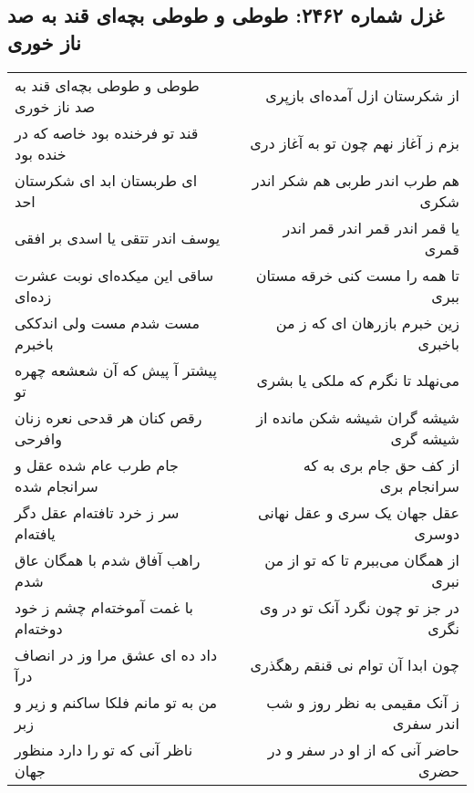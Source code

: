 \begin{center}
\section*{غزل شماره ۲۴۶۲: طوطی و طوطی بچه‌ای قند به صد ناز خوری}
\label{sec:2462}
\begin{longtable}{l p{0.5cm} r}
طوطی و طوطی بچه‌ای قند به صد ناز خوری
&&
از شکرستان ازل آمده‌ای بازپری
\\
قند تو فرخنده بود خاصه که در خنده بود
&&
بزم ز آغاز نهم چون تو به آغاز دری
\\
ای طربستان ابد ای شکرستان احد
&&
هم طرب اندر طربی هم شکر اندر شکری
\\
یوسف اندر تتقی یا اسدی بر افقی
&&
یا قمر اندر قمر اندر قمر اندر قمری
\\
ساقی این میکده‌ای نوبت عشرت زده‌ای
&&
تا همه را مست کنی خرقه مستان ببری
\\
مست شدم مست ولی اندککی باخبرم
&&
زین خبرم بازرهان ای که ز من باخبری
\\
پیشتر آ پیش که آن شعشعه چهره تو
&&
می‌نهلد تا نگرم که ملکی یا بشری
\\
رقص کنان هر قدحی نعره زنان وافرحی
&&
شیشه گران شیشه شکن مانده از شیشه گری
\\
جام طرب عام شده عقل و سرانجام شده
&&
از کف حق جام بری به که سرانجام بری
\\
سر ز خرد تافته‌ام عقل دگر یافته‌ام
&&
عقل جهان یک سری و عقل نهانی دوسری
\\
راهب آفاق شدم با همگان عاق شدم
&&
از همگان می‌ببرم تا که تو از من نبری
\\
با غمت آموخته‌ام چشم ز خود دوخته‌ام
&&
در جز تو چون نگرد آنک تو در وی نگری
\\
داد ده ای عشق مرا وز در انصاف درآ
&&
چون ابدا آن توام نی قنقم رهگذری
\\
من به تو مانم فلکا ساکنم و زیر و زبر
&&
ز آنک مقیمی به نظر روز و شب اندر سفری
\\
ناظر آنی که تو را دارد منظور جهان
&&
حاضر آنی که از او در سفر و در حضری
\\
\end{longtable}
\end{center}
